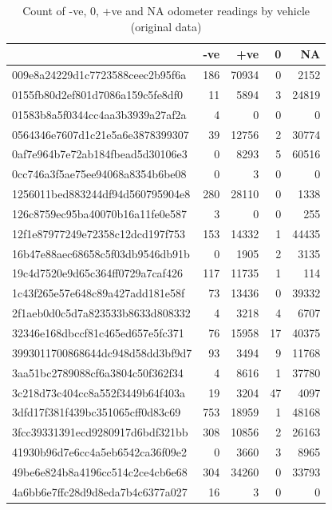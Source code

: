 \documentclass[]{article}
\begin{document}
\begin{table}[t]

\caption{\label{tab:checkOdometer}Count of -ve, 0, +ve and NA odometer readings by vehicle (original data)}
\centering
\begin{tabular}{l|r|r|r|r}
\hline
  & -ve & +ve & 0 & NA\\
\hline
009e8a24229d1c7723588ceec2b95f6a & 186 & 70934 & 0 & 2152\\
\hline
0155fb80d2ef801d7086a159c5fe8df0 & 11 & 5894 & 3 & 24819\\
\hline
01583b8a5f0344cc4aa3b3939a27af2a & 4 & 0 & 0 & 0\\
\hline
0564346e7607d1c21e5a6e3878399307 & 39 & 12756 & 2 & 30774\\
\hline
0af7e964b7e72ab184fbead5d30106e3 & 0 & 8293 & 5 & 60516\\
\hline
0cc746a3f5ae75ee94068a8354b6be08 & 0 & 3 & 0 & 0\\
\hline
1256011bed883244df94d560795904e8 & 280 & 28110 & 0 & 1338\\
\hline
126c8759ec95ba40070b16a11fe0e587 & 3 & 0 & 0 & 255\\
\hline
12f1e87977249e72358c12dcd197f753 & 153 & 14332 & 1 & 44435\\
\hline
16b47e88aec68658c5f03db9546db91b & 0 & 1905 & 2 & 3135\\
\hline
19c4d7520e9d65c364ff0729a7caf426 & 117 & 11735 & 1 & 114\\
\hline
1c43f265e57e648c89a427add181e58f & 73 & 13436 & 0 & 39332\\
\hline
2f1aeb0d0c5d7a823533b8633d808332 & 4 & 3218 & 4 & 6707\\
\hline
32346e168dbccf81c465ed657e5fc371 & 76 & 15958 & 17 & 40375\\
\hline
3993011700868644dc948d58dd3bf9d7 & 93 & 3494 & 9 & 11768\\
\hline
3aa51bc2789088cf6a3804c50f362f34 & 4 & 8616 & 1 & 37780\\
\hline
3c218d73c404cc8a552f3449b64f403a & 19 & 3204 & 47 & 4097\\
\hline
3dfd17f381f439bc351065cff0d83c69 & 753 & 18959 & 1 & 48168\\
\hline
3fcc39331391ecd9280917d6bdf321bb & 308 & 10856 & 2 & 26163\\
\hline
41930b96d7e6cc4a5eb6542ca36f09e2 & 0 & 3660 & 3 & 8965\\
\hline
49be6e824b8a4196cc514c2ce4cb6e68 & 304 & 34260 & 0 & 33793\\
\hline
4a6bb6e7ffc28d9d8eda7b4c6377a027 & 16 & 3 & 0 & 0\\

\end{tabular}
\end{table}
\end{document}
